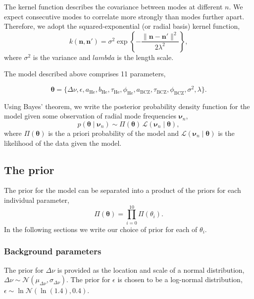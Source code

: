 \documentclass[linenumbers,modern]{aastex631}
\newcommand{\helium}{\mathrm{He}}
\newcommand{\bcz}{\mathrm{BCZ}}
\begin{document}
The kernel function describes the covariance between modes at different \(n\).
We expect consecutive modes to correlate more strongly than modes further
apart. Therefore, we adopt the squared-exponential (or radial basis) kernel
function,
%
\begin{equation}
    k(\bm n, \bm n') = \sigma^2 
    \exp\left\{- \frac{\| \bm n - \bm n' \|^2}{2\lambda^2}\right\},
\end{equation}
%
where \(\sigma^2\) is the variance and \(lambda\) is the length scale.

The model described above comprises 11 parameters,

\begin{equation}
    \bm\theta = \{\Delta\nu, \epsilon, a_\helium, b_\helium, \tau_\helium,
    \phi_\helium, a_\bcz, \tau_\bcz, \phi_\bcz, \sigma^2, \lambda\}.
\end{equation}

Using Bayes' theorem, we write the posterior probability density function for
the model given some observation of radial mode frequencies \(\bm\nu_n\),
%
\begin{equation}
    p(\bm\theta \mid \bm\nu_n) \sim \Pi(\bm\theta) \, 
    \mathcal{L}(\bm\nu_n \mid \bm\theta),
\end{equation}
%
where \(\Pi(\bm\theta)\) is the a priori probability of the model and
\(\mathcal{L}(\bm\nu_n \mid \bm\theta)\) is the likelihood of the data given the
model.


\subsection{The prior} \label{sec:prior}

The prior for the model can be separated into a product of the priors for each
individual parameter,
%
\begin{equation}
    \Pi(\bm\theta) = \prod_{i=0}^{10} \Pi(\theta_i).
\end{equation}
%
In the following sections we write our choice of prior for each of
\(\theta_i\).

\subsubsection{Background parameters} \label{sec:bkg-params}

The prior for \(\Delta\nu\) is provided as the location and scale of a
normal distribution, \(\Delta\nu \sim \mathcal{N}(\mu_{\Delta\nu},
\sigma_{\Delta\nu})\). The prior for \(\epsilon\) is chosen to be a log-normal
distribution, \(\epsilon \sim \ln\mathcal{N}(\ln(1.4), 0.4)\).
\end{document}
